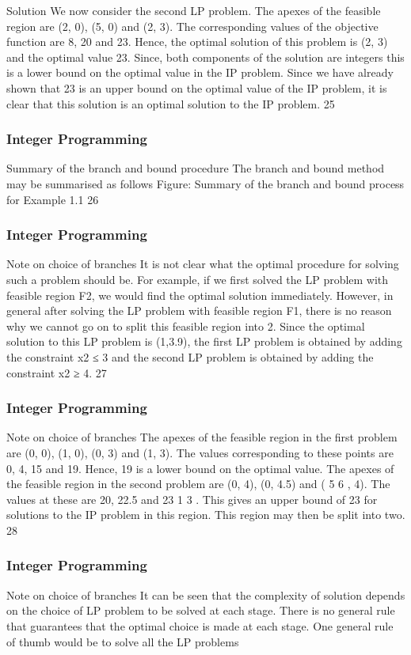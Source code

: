 \begin{frame}
Solution
We now consider the second LP problem. The apexes of the
feasible region are (2, 0), (5, 0) and (2, 3). The corresponding
values of the objective function are 8, 20 and 23.
Hence, the optimal solution of this problem is (2, 3) and the
optimal value 23. Since, both components of the solution are
integers this is a lower bound on the optimal value in the IP
problem.
Since we have already shown that 23 is an upper bound on the
optimal value of the IP problem, it is clear that this solution is an
optimal solution to the IP problem.
25 \end{frame}  \begin{frame} \frametitle{Integer Programming}     
Summary of the branch and bound procedure
The branch and bound method may be summarised as follows
Figure: Summary of the branch and bound process for Example 1.1 26 \end{frame}  \begin{frame} \frametitle{Integer Programming}     
Note on choice of branches
It is not clear what the optimal procedure for solving such a
problem should be. For example, if we first solved the LP problem
with feasible region F2, we would find the optimal solution
immediately.
However, in general after solving the LP problem with feasible
region F1, there is no reason why we cannot go on to split this
feasible region into 2.
Since the optimal solution to this LP problem is (1,3.9), the first
LP problem is obtained by adding the constraint x2 ≤ 3 and the
second LP problem is obtained by adding the constraint x2 ≥ 4.
27 \end{frame}  \begin{frame} \frametitle{Integer Programming}     
Note on choice of branches
The apexes of the feasible region in the first problem are (0, 0), (1,
0), (0, 3) and (1, 3). The values corresponding to these points are
0, 4, 15 and 19. Hence, 19 is a lower bound on the optimal value.
The apexes of the feasible region in the second problem are (0, 4),
(0, 4.5) and ( 5
6
, 4). The values at these are 20, 22.5 and 23 1
3
.
This gives an upper bound of 23 for solutions to the IP problem in
this region. This region may then be split into two.
28 \end{frame}  \begin{frame} \frametitle{Integer Programming}     
Note on choice of branches
It can be seen that the complexity of solution depends on the
choice of LP problem to be solved at each stage. There is no
general rule that guarantees that the optimal choice is made at
each stage.
One general rule of thumb would be to solve all the LP problems

\end{frame}
